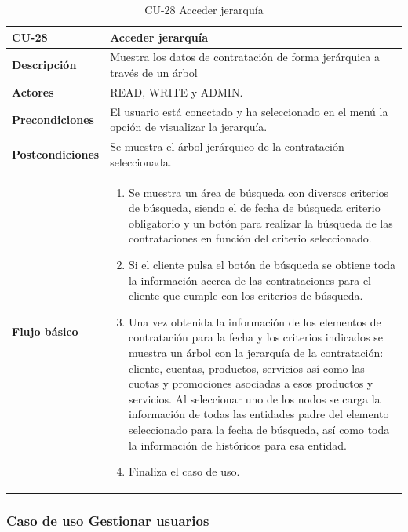 \begin{table} [H]
    \centering
    \setlength{\leftmargini}{0.4cm}
	\resizebox{14cm}{!} { %
    \begin{tabular}{| m{3cm} | m{11cm} |}   
    \hline
	  \textbf{CU-28} & \textbf{Acceder jerarquía} \\\hline
	  \textbf{Descripción} & Muestra los datos de contratación de forma jerárquica a través de un árbol \\\hline
	  \textbf{Actores} & READ, WRITE y ADMIN. \\\hline
	  \textbf{Precondiciones} & El usuario está conectado y ha seleccionado en el menú la opción de visualizar la jerarquía. \\\hline
	  \textbf{Postcondiciones} & Se muestra el árbol jerárquico de la contratación seleccionada. \\\hline
	  \textbf{Flujo básico} & 
		\begin{enumerate}
	  	\item Se muestra un área de búsqueda con diversos criterios de búsqueda, siendo el de fecha de búsqueda criterio obligatorio y un botón para realizar la búsqueda de las contrataciones en función del criterio seleccionado. 
	  	\item Si el cliente pulsa el botón de búsqueda se obtiene toda la información acerca de las contrataciones para el cliente que cumple con los criterios de búsqueda. 
	  	\item Una vez obtenida la información de los elementos de contratación para la fecha y los criterios indicados se muestra un árbol con la jerarquía de la contratación: cliente, cuentas, productos, servicios así como las cuotas y promociones asociadas a esos productos y servicios. Al seleccionar uno de los nodos se carga la información de todas las entidades padre del elemento seleccionado para la fecha de búsqueda, así como toda la información de históricos para esa entidad.
	  	\item Finaliza el caso de uso.
	  \end{enumerate} 	  	  
	  \\\hline
    \end{tabular}
    } %
    \caption{CU-28 Acceder jerarquía}
    \label{tab:cu-acceder-jerarquia}
\end{table}



\subsubsection{Caso de uso Gestionar usuarios} 
\label{sub:cu-gestionar-usuarios}


